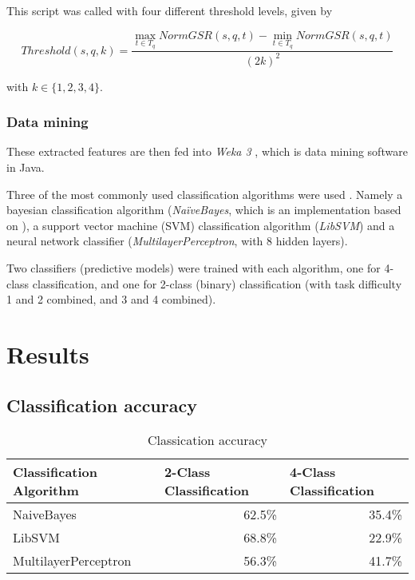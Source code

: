 \documentclass[11pt,leqno,letterpaper]{report} %
\begin{document}
This script was called with four different threshold levels, given by

\[
Threshold(s,q,k) = \frac 
{\max_{t \in T_q} NormGSR(s,q,t) - \min_{t \in T_q} NormGSR(s,q,t)} 
{(2k)^2}
\]

with $k \in \{1,2,3,4\}$.


\subsection{Data mining}

These extracted features are then fed into \emph{Weka 3} \citep{weka}, which is data mining software in Java. 


Three of the most commonly used classification algorithms were used \citep{small}. Namely a bayesian classification algorithm (\emph{Na\"iveBayes}, which is an implementation based on \citep{john1995estimating}), a support vector machine (SVM) classification algorithm (\emph{LibSVM}) \citep{libsvm} and a neural network classifier (\emph{MultilayerPerceptron}, with 8 hidden layers). 

Two classifiers (predictive models) were trained with each algorithm, one for 4-class classification, and one for 2-class (binary) classification (with task difficulty 1 and 2 combined, and 3 and 4 combined).


\chapter{Results}
\section{Classification accuracy}
\begin{table}[h]
\caption {Classication accuracy} 
\center
\begin{tabular}{@{}lrr@{}}
\toprule
Classification Algorithm & \multicolumn{1}{l}{2-Class Classification} & \multicolumn{1}{l}{4-Class Classification} \\ \midrule
NaiveBayes               & 62.5\%                                     & 35.4\%                                     \\
LibSVM                   & 68.8\%                                     & 22.9\%                                     \\
MultilayerPerceptron     & 56.3\%                                     & 41.7\%                                     \\ \bottomrule
\end{tabular}
\end{table}
\end{document}
